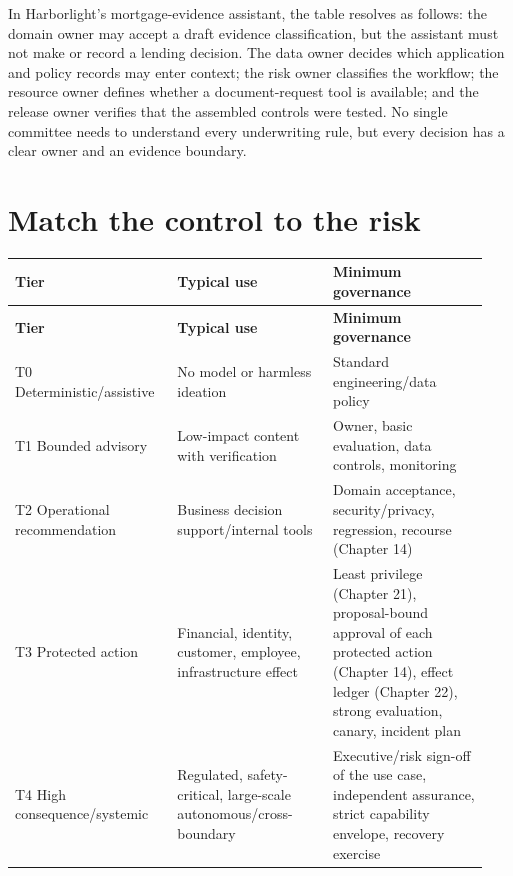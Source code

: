 In Harborlight's mortgage-evidence assistant, the table resolves as follows: the domain owner may accept a draft evidence classification, but the assistant must not make or record a lending decision. The data owner decides which application and policy records may enter context; the risk owner classifies the workflow; the resource owner defines whether a document-request tool is available; and the release owner verifies that the assembled controls were tested. No single committee needs to understand every underwriting rule, but every decision has a clear owner and an evidence boundary.\par

\section{Match the control to the risk}

\BookTableStart
\small
\begin{longtable}{@{}Y{0.3133\linewidth}Y{0.3133\linewidth}Y{0.3133\linewidth}@{}}
\color{white}\bfseries \textbf{Tier} & \color{white}\bfseries \textbf{Typical use} & \color{white}\bfseries \textbf{Minimum governance} \\
\endfirsthead
{}
\color{white}\bfseries \textbf{Tier} & \color{white}\bfseries \textbf{Typical use} & \color{white}\bfseries \textbf{Minimum governance} \\
\endhead
T0 Deterministic/assistive & No model or harmless ideation & Standard engineering/data policy \\
T1 Bounded advisory & Low-impact content with verification & Owner, basic evaluation, data controls, monitoring \\
T2 Operational recommendation & Business decision support/internal tools & Domain acceptance, security/privacy, regression, recourse (Chapter 14) \\
T3 Protected action & Financial, identity, customer, employee, infrastructure effect & Least privilege (Chapter 21), proposal-bound approval of each protected action (Chapter 14), effect ledger (Chapter 22), strong evaluation, canary, incident plan \\
T4 High consequence/systemic & Regulated, safety-critical, large-scale autonomous/cross-boundary & Executive/risk sign-off of the use case, independent assurance, strict capability envelope, recovery exercise \\
\end{longtable}
\BookTableEnd

